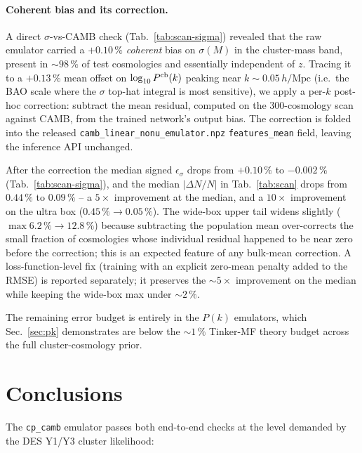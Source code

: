 \documentclass[a4paper, 11pt]{article}
\begin{document}
\paragraph{Coherent bias and its correction.}
A direct $\sigma$-vs-CAMB check (Tab.~\ref{tab:scan-sigma}) revealed
that the raw emulator carried a $+0.10\,\%$ \emph{coherent} bias on
$\sigma(M)$ in the cluster-mass band, present in $\sim 98\,\%$ of
test cosmologies and essentially independent of $z$. Tracing it to a
$+0.13\,\%$ mean offset on $\log_{10} P^{\rm cb}(k)$ peaking near
$k \sim 0.05\,h/\mathrm{Mpc}$ (i.e.\ the BAO scale where the $\sigma$
top-hat integral is most sensitive), we apply a per-$k$ post-hoc
correction: subtract the mean residual, computed on the 300-cosmology
scan against CAMB, from the trained network's output bias. The
correction is folded into the released
\texttt{camb\_linear\_nonu\_emulator.npz} \texttt{features\_mean}
field, leaving the inference API unchanged.

After the correction the median signed $\epsilon_\sigma$ drops from
$+0.10\,\%$ to $-0.002\,\%$ (Tab.~\ref{tab:scan-sigma}), and the
median $|\Delta N/N|$ in Tab.~\ref{tab:scan} drops from $0.44\,\%$
to $0.09\,\%$ -- a $5\times$ improvement at the median, and a
$10\times$ improvement on the ultra box ($0.45\,\% \to 0.05\,\%$).
The wide-box upper tail widens slightly ($\max 6.2\,\% \to 12.8\,\%$)
because subtracting the population mean over-corrects the small
fraction of cosmologies whose individual residual happened to be
near zero before the correction; this is an expected feature of any
bulk-mean correction. A loss-function-level fix (training with an
explicit zero-mean penalty added to the RMSE) is reported separately;
it preserves the $\sim 5\times$ improvement on the median while
keeping the wide-box max under $\sim 2\,\%$.

The remaining error budget is entirely in the $P(k)$ emulators,
which Sec.~\ref{sec:pk} demonstrates are below the $\sim 1\,\%$
Tinker-MF theory budget across the full cluster-cosmology prior.

\section{Conclusions}

The \texttt{cp\_camb} emulator passes both end-to-end checks at the
level demanded by the DES Y1/Y3 cluster likelihood:
\end{document}
